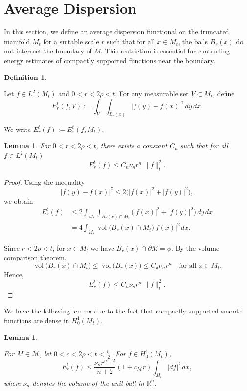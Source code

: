 \documentclass[10 pt, reqno]{amsart}
\newcommand{\M}{\mathcal{M}}
\newtheorem{lemma}[theorem]{Lemma}
\theoremstyle{definition}
\newtheorem{definition}{Definition}
\numberwithin{equation}{section}
\newcommand{\MMM}{\mathcal{M}}
\begin{document}
\section{Average Dispersion}


In this section, we define an average dispersion functional on the truncated manifold $M_t$ for a suitable scale $r$ such that for all $x\in M_t$, the balls $B_r(x)$ do not intersect the boundary of $M$. This restriction is essential for controlling energy estimates of  compactly supported functions near the boundary.

\begin{definition}\label{def:localized-energy-Mrho}

Let $f\in L^2(M_t)$ and $0<r<2\rho<t$. For any measurable set $V\subset M_t$, define
\[
E_r^t(f,V)
:=
\int_V\int_{B_r(x)}
|f(y)-f(x)|^2\,dy\,dx.
\]

\end{definition}
We write $E_r^t(f):=E_r^t(f,M_t)$. 
\begin{lemma}\label{rem:energy-bound-Mrho} For $0<r<2\rho<t$,
there exists a constant $C_n$ such that for all
$f\in L^2(M_t)$ 
\[
E_r^t(f)
\le
C_n\nu_n r^n\,\|f\|_t^2.
\]
\end{lemma}
\begin{proof}
Using the inequality
\[
|f(y)-f(x)|^2 \le 2\bigl(|f(x)|^2+|f(y)|^2\bigr),
\]
we obtain
\begin{align*}
E_r^t(f)
&\le
2\int_{M_t}\int_{B_r(x)\cap M_t}
\bigl(|f(x)|^2+|f(y)|^2\bigr)\,dy\,dx \\
&=
4\int_{M_t}
\operatorname{vol}\bigl(B_r(x)\cap M_t\bigr)
|f(x)|^2\,dx.
\end{align*}

Since $r<2\rho<t$, for $x\in M
_t$ we have $B_r(x)\cap \partial M =\phi$. By the volume comparison theorem,
\[
\operatorname{vol}\bigl(B_r(x)\cap M_t\bigr)
\le \operatorname{vol}\bigl(B_r(x))\le  C_n\nu_n r^n
\quad\text{for all }x\in M_t.
\]
Hence,
\[
E_r^t(f)\le C_n\nu_n r^n\,\|f\|_t^2.
\]
\end{proof}
We have the following lemma due to the fact that compactly supported smooth functions are dense in $H^1_0(M_t)$.
\begin{lemma}\label{lem:Er-Mrho}

For $M\in \M$, let $0< r < 2\rho<t<\frac{i_0}{2}$. For $f\in H^1_0(M_t)$,
\[
E_r^t(f)
\le
\frac{\nu_{n}r^{n+2}}{n+2}(1+c_\MMM r)
\int_{M_t} |d f|^2\,dx,
\]where $\nu_n$ denotes the volume of the unit ball in $\mathbb{R}^n$.
\end{lemma}
\end{document}
